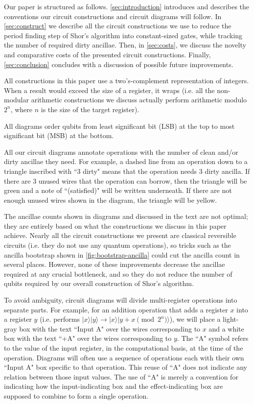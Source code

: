 \documentclass[twocolumn,longbibliography]{quantumarticle}
\begin{document}
Our paper is structured as follows.
\autoref{sec:introduction} introduces and describes the conventions our circuit constructions and circuit diagrams will follow.
In \autoref{sec:construct} we describe all the circuit constructions we use to reduce the period finding step of Shor's algorithm into constant-sized gates, while tracking the number of required dirty ancillae.
Then, in \autoref{sec:costs}, we discuss the novelty and comparative costs of the presented circuit constructions.
Finally, \autoref{sec:conclusion} concludes with a discussion of possible future improvements.

All constructions in this paper use a two's-complement representation of integers.
When a result would exceed the size of a register, it wraps (i.e. all the non-modular arithmetic constructions we discuss actually perform arithmetic modulo $2^n$, where $n$ is the size of the target register).

All diagrams order qubits from least significant bit (LSB) at the top to most significant bit (MSB) at the bottom.

All our circuit diagrams annotate operations with the number of clean and/or dirty ancillae they need.
For example, a dashed line from an operation down to a triangle inscribed with ``3 dirty" means that the operation needs 3 dirty ancilla.
If there are 3 unused wires that the operation can borrow, then the triangle will be green and a note of ``(satisfied)" will be written underneath.
If there are not enough unused wires shown in the diagram, the triangle will be yellow.

The ancillae counts shown in diagrams and discussed in the text are not optimal; they are entirely based on what the constructions we discuss in this paper achieve.
Nearly all the circuit constructions we present are classical reversible circuits (i.e. they do not use any quantum operations), so tricks such as the ancilla bootstrap shown in \autoref{fig:bootstrap-ancilla} could cut the ancilla count in several places.
However, none of these improvements decrease the ancillae required at any crucial bottleneck, and so they do not reduce the number of qubits required by our overall construction of Shor's algorithm.

To avoid ambiguity, circuit diagrams will divide multi-register operations into separate parts.
For example, for an addition operation that adds a register $x$ into a register $y$ (i.e. performs $|x\rangle |y\rangle \rightarrow |x\rangle |y + x \pmod{2^n} \rangle$), we will place a light-gray box with the text ``Input A" over the wires corresponding to $x$ and a white box with the text ``+A" over the wires corresponding to $y$.
The ``A" symbol refers to the value of the input register, in the computational basis, at the time of the operation.
Diagrams will often use a sequence of operations each with their own ``Input A" box specific to that operation.
This reuse of ``A" does not indicate any relation between those input values.
The use of ``A" is merely a convention for indicating how the input-indicating box and the effect-indicating box are supposed to combine to form a single operation.
\end{document}
